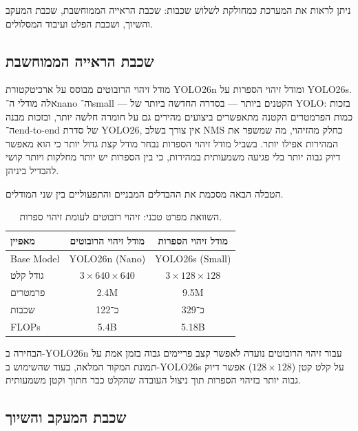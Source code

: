 ניתן לראות את המערכת כמחולקת לשלוש שכבות: שכבת הראייה הממוחשבת, שכבת
המעקב והשיוך, ושכבת הפלט ועיבוד המסלולים.

\subsection{שכבת הראייה הממוחשבת}



מודל זיהוי הרובוטים מבוסס על ארכיטקטורת \textenglish{YOLO26n} ומודל
זיהוי הספרות על \textenglish{YOLO26s}. אלה מודלי ה־\textenglish{nano}
וה־\textenglish{small} --- הקטנים ביותר --- בסדרה החדשה ביותר של
\textenglish{YOLO}: בזכות כמות הפרמטרים הקטנה מתאפשרים ביצועים מהירים
גם על חומרה חלשה יותר, ובזכות מבנה ה־\textenglish{end-to-end} של סדרת
\textenglish{YOLO26}, אין צורך בשלב \textenglish{NMS} כחלק מהזיהוי, מה
שמשפר את המהירות אפילו יותר. בשביל מודל זיהוי הספרות נבחר מודל קצת
גדול יותר כי הוא מאפשר דיוק גבוה יותר בלי פגיעה משמעותית במהירות, כי
בין הספרות יש יותר מחלקות ויותר קושי להבדיל ביניהן.

הטבלה הבאה מסכמת את ההבדלים המבניים והתפעוליים בין שני המודלים.

\begin{table}[H]
\centering
\label{tab:model_comparison}
\begin{tabular}{|l|c|c|}
\hline \textbf{מאפיין} & \textbf{מודל זיהוי הרובוטים} & \textbf{מודל
זיהוי הספרות} \\ \hline \textenglish{Base Model} &
\textenglish{YOLO26n} (Nano) & \textenglish{YOLO26s} (Small) \\ \hline
גודל קלט & $3 \times 640 \times 640$ & $3 \times 128 \times 128$
\\ \hline פרמטרים & 2.4M & 9.5M \\ \hline
שכבות & כ־122 & כ־329 \\ \hline \textenglish{FLOPs} & 5.4B & 5.18B
\\ \hline
\end{tabular}
\caption{השוואת מפרט טכני: זיהוי רובוטים לעומת זיהוי ספרות.}
\end{table}

הבחירה ב-\textenglish{YOLO26n} עבור זיהוי הרובוטים נועדה לאפשר קצב
פריימים גבוה בזמן אמת על תמונת המקור המלאה, בעוד שהשימוש
ב-\textenglish{YOLO26s} על קלט קטן ($128 \times 128$) אפשר דיוק גבוה
יותר בזיהוי הספרות תוך ניצול העובדה שהקלט כבר חתוך וקטן משמעותית.

\subsection{שכבת המעקב והשיוך}

